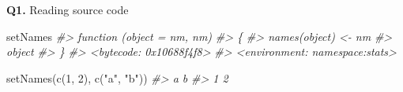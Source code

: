\documentclass[
]{book}
\newenvironment{Shaded}{\begin{snugshade}}{\end{snugshade}}
\newcommand{\CommentTok}[1]{\textcolor[rgb]{0.56,0.35,0.01}{\textit{#1}}}
\newcommand{\DecValTok}[1]{\textcolor[rgb]{0.00,0.00,0.81}{#1}}
\newcommand{\FunctionTok}[1]{\textcolor[rgb]{0.00,0.00,0.00}{#1}}
\newcommand{\NormalTok}[1]{#1}
\newcommand{\StringTok}[1]{\textcolor[rgb]{0.31,0.60,0.02}{#1}}
\begin{document}
\textbf{Q1.} Reading source code

\begin{Shaded}
\begin{Highlighting}[]
\NormalTok{setNames}
\CommentTok{\#\textgreater{} function (object = nm, nm) }
\CommentTok{\#\textgreater{} \{}
\CommentTok{\#\textgreater{}     names(object) \textless{}{-} nm}
\CommentTok{\#\textgreater{}     object}
\CommentTok{\#\textgreater{} \}}
\CommentTok{\#\textgreater{} \textless{}bytecode: 0x10688f4f8\textgreater{}}
\CommentTok{\#\textgreater{} \textless{}environment: namespace:stats\textgreater{}}

\FunctionTok{setNames}\NormalTok{(}\FunctionTok{c}\NormalTok{(}\DecValTok{1}\NormalTok{, }\DecValTok{2}\NormalTok{), }\FunctionTok{c}\NormalTok{(}\StringTok{"a"}\NormalTok{, }\StringTok{"b"}\NormalTok{))}
\CommentTok{\#\textgreater{} a b }
\CommentTok{\#\textgreater{} 1 2}
\end{Highlighting}
\end{Shaded}
\end{document}
